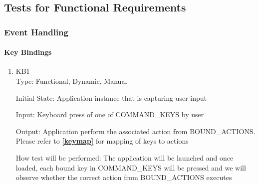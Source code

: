 \documentclass[12pt, titlepage]{article}
\begin{document}
	\subsection{Tests for Functional Requirements}
	\subsubsection{Event Handling}
	
	\paragraph{Key Bindings}
	\begin{enumerate}
		\item{KB1\\}
		Type: Functional, Dynamic, Manual
		
		Initial State: Application instance that is capturing user input
		
		Input: Keyboard press of one of COMMAND\_KEYS by user
		
		Output: Application perform the associated action from BOUND\_ACTIONS. 
		Please refer to \textbf{\autoref{keymap}}  for mapping of keys
		to actions
		
		How test will be performed: The application will be launched and once loaded,
		each bound key in COMMAND\_KEYS will be pressed and we will observe whether
		the correct action from BOUND\_ACTIONS executes
		
	\end{enumerate}
\end{document}
